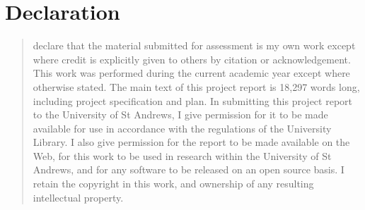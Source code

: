 \chapter*{Declaration}
\begin{SingleSpace}
\begin{quote}
 declare that the material submitted for assessment is my own work except where credit is explicitly given to others by citation or acknowledgement. This work was performed during the current academic year except where otherwise stated. The main text of this project report is 18,297 words long, including project specification and plan. In submitting this project report to the University of St Andrews, I give permission for it to be made available for use in accordance with the regulations of the University Library. I also give permission for the report to be made available on the Web, for this work to be used in research within the University of St Andrews, and for any software to be released on an open source basis. I retain the copyright in this work, and ownership of any resulting intellectual property.

\vspace{1.5cm}
\noindent
\end{quote}
\end{SingleSpace}
\clearpage